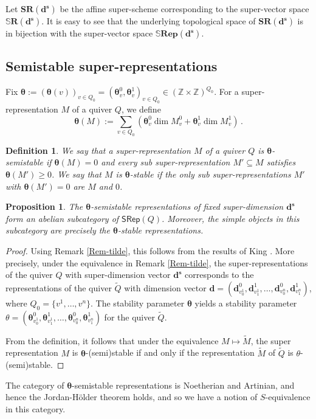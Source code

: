 \documentclass[12pt, reqno]{amsart}
\theoremstyle{plain}
\newtheorem{definition}[theorem]{Definition}
\newtheorem{proposition}[theorem]{Proposition}
\numberwithin{equation}{section}
\def \d{\mathbf{d}}
\def \sd{\mathbf{d^s}}
\def \Z{\mathbb{Z}}
\def \bS{\mathbb{S}}
\def \bfR{\mathbf{Rep}}
\def \bfSR{\mathbf{SR}}
\def \btheta{\boldsymbol{\theta}}
\def \bbSR{\mathbb{S}\mathbf{R}}
\begin{document}
Let $\bfSR(\sd)$ be the affine super-scheme corresponding to the 
super-vector space $\bbSR(\sd)$. It is easy to see that the underlying
topological space of $\bfSR(\sd)$ is in bijection with the super-vector 
space $\bS \bfR(\sd)$.


\subsection{Semistable super-representations}
Fix $\btheta := (\btheta(v))_{v \in Q_0} = (\btheta_v^0, \btheta_v^1)_{v \in Q_0} \in (\Z\times\Z)^{Q_0}$. For a super-representation $M$ of 
a quiver $Q$, we define
$$
\btheta(M) := \sum_{v\in Q_0} (\btheta_v^0 \dim M_v^0 + \btheta_v^1 \dim M_v^1)\,.
$$


\begin{definition}\label{def-theta-ss}\rm{
We say that a super-representation $M$ of a quiver $Q$ is 
$\btheta$-\emph{semistable} if $\btheta(M) = 0$ and every sub 
super-representation $M'\subseteq M$ satisfies $\btheta(M') \geq 0$. 
We say that $M$ is $\btheta$-\emph{stable} if the only sub super-representations $M'$ with $\btheta(M') = 0$ are $M$ and $0$.
}
\end{definition}

\begin{proposition}\label{prop-btheta-ss-AC}
The $\btheta$-semistable representations of fixed super-dimension $\sd$ form an abelian subcategory of 
$\mathsf{SRep}(Q)$. Moreover, the simple objects in this subcategory 
are precisely the $\btheta$-stable representations.
\end{proposition}
\begin{proof}
Using Remark \ref{Rem-tilde}, this follows from the results of King \cite{Ki94}. 
More precisely, under the equivalence in Remark \ref{Rem-tilde}, the super-representations of the quiver $Q$ with super-dimension vector $\sd$ corresponds to the representations of the quiver $\tilde{Q}$ with dimension vector $\d = (\d^{0}_{v_{0}^{1}}, \d^{1}_{v_{1}^{1}}, \dots , \d^{0}_{v_{0}^{n}}, \d^{1}_{v_{1}^{n}})$, where $Q_0 = \{v^1, \dots, v^n\}$. The stability parameter $\btheta$ yields a stability parameter $\theta = (\btheta^{0}_{v_{0}^{1}}, \btheta^{1}_{v_{1}^{1}}, \dots , \btheta^{0}_{v_{0}^{n}}, \btheta^{1}_{v_{1}^{n}})$ for the quiver $\tilde{Q}$.

From the definition, it follows that under the equivalence $M\mapsto \tilde{M}$, the super representation $M$ is $\btheta$-(semi)stable if and only if the representation $\tilde{M}$ of $\tilde{Q}$ is $\theta$-(semi)stable. 
\end{proof}
The category of $\btheta$-semistable representations is Noetherian and
Artinian, and hence the Jordan-H\"older theorem holds, and so we have 
a notion of $S$-equivalence in this category.
\end{document}
